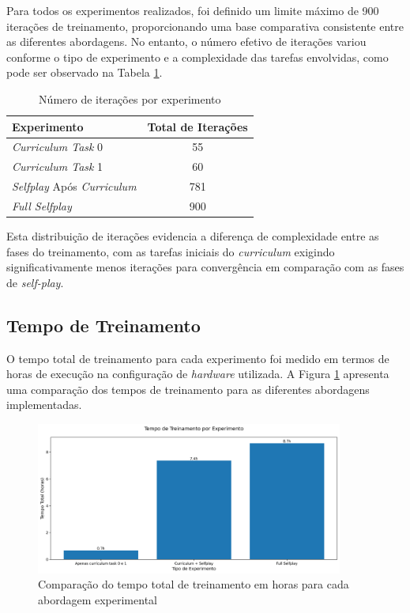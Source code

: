 Para todos os experimentos realizados, foi definido um limite máximo de 900 iterações de treinamento, proporcionando uma base comparativa consistente entre as diferentes abordagens. No entanto, o número efetivo de iterações variou conforme o tipo de experimento e a complexidade das tarefas envolvidas, como pode ser observado na Tabela \ref{tab:iteracoes_experimentos}.

\begin{table}[h]
    \centering
    \caption{Número de iterações por experimento}
    \label{tab:iteracoes_experimentos}
    \begin{tabular}{|l|c|}
        \hline
        \textbf{Experimento} & \textbf{Total de Iterações} \\
        \hline
        \textit{Curriculum Task} 0 & 55 \\
        \textit{Curriculum Task} 1 & 60 \\
        \textit{Selfplay} Após \textit{Curriculum} & 781 \\
        \textit{Full Selfplay} & 900 \\
        \hline
    \end{tabular}
\end{table}

Esta distribuição de iterações evidencia a diferença de complexidade entre as fases do treinamento, com as tarefas iniciais do \textit{curriculum} exigindo significativamente menos iterações para convergência em comparação com as fases de \textit{self-play}.

\subsection{Tempo de Treinamento}

O tempo total de treinamento para cada experimento foi medido em termos de horas de execução na configuração de \textit{hardware} utilizada. A Figura \ref{fig:tempo_treinamento} apresenta uma comparação dos tempos de treinamento para as diferentes abordagens implementadas.

\begin{figure}[H]
    \centering
    \includegraphics[width=0.9\textwidth]{fig/graficos_trabalho/graficos_experimentos/graficos_tempo_treino/tempo_treinamento.png}
    \caption{Comparação do tempo total de treinamento em horas para cada abordagem experimental}
    \label{fig:tempo_treinamento}
\end{figure}

